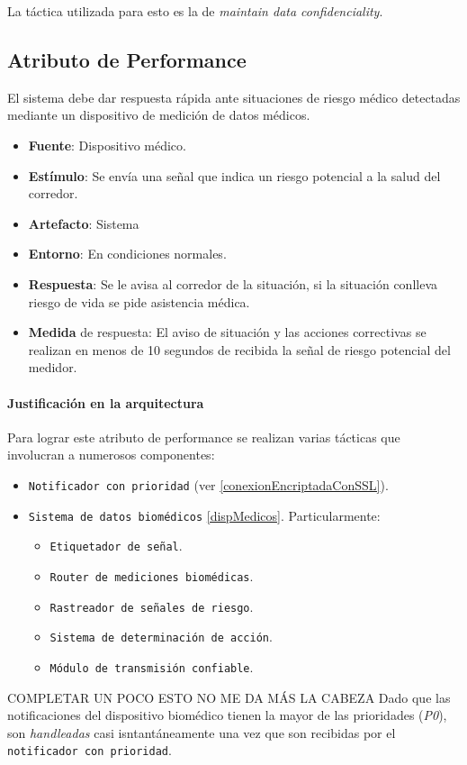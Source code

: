La táctica utilizada para esto es la de \emph{maintain data confidenciality}.


\subsection{Atributo de Performance}
El sistema debe dar respuesta rápida ante situaciones de riesgo médico detectadas mediante un dispositivo de medición de datos médicos.

\begin{itemize}
  \item \textbf{Fuente}: Dispositivo médico.
  \item \textbf{Estímulo}: Se envía una señal que indica un riesgo potencial a la salud del corredor.
  \item \textbf{Artefacto}: Sistema
  \item \textbf{Entorno}: En condiciones normales.
  \item \textbf{Respuesta}: Se le avisa al corredor de la situación, si la situación conlleva riesgo de vida se pide asistencia médica.
  \item \textbf{Medida} de respuesta: El aviso de situación y las acciones correctivas se realizan en menos de 10 segundos de recibida la señal de riesgo potencial del medidor.
\end{itemize}

\paragraph{Justificación en la arquitectura}
Para lograr este atributo de performance se realizan varias tácticas que involucran a numerosos componentes: 
\begin{itemize}
  \item \texttt{Notificador con prioridad} (ver \ref{conexionEncriptadaConSSL}).
  \item \texttt{Sistema de datos biomédicos} \ref{dispMedicos}. Particularmente: 
  \begin{itemize}
    \item \texttt{Etiquetador de señal}.
    \item \texttt{Router de mediciones biomédicas}.
    \item \texttt{Rastreador de señales de riesgo}.
    \item \texttt{Sistema de determinación de acción}.
    \item \texttt{Módulo de transmisión confiable}.
  \end{itemize}
\end{itemize}
COMPLETAR UN POCO ESTO NO ME DA MÁS LA CABEZA
Dado que las notificaciones del dispositivo biomédico tienen la mayor de las prioridades (\emph{P0}), son \emph{handleadas} casi isntantáneamente una vez que son recibidas por el \texttt{notificador con prioridad}. 

